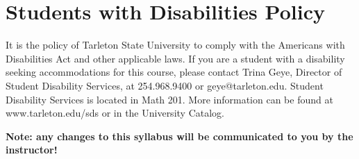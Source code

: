 \documentclass[10pt]{article}
\begin{document}
\section*{Students with Disabilities Policy}
\label{sec-10}

It is the policy of Tarleton State University to comply with the Americans
with Disabilities Act and other applicable laws. If you are a student with a
disability seeking accommodations for this course, please contact Trina
Geye, Director of Student Disability Services, at 254.968.9400 or
geye@tarleton.edu. Student Disability Services is
located in Math 201. More information can be found at www.tarleton.edu/sds or in the University Catalog.


\textbf{\textbf{Note:  any changes to this syllabus will be communicated to you by the instructor!}}
\end{document}

